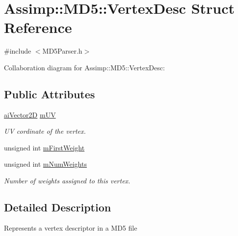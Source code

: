 \hypertarget{struct_assimp_1_1_m_d5_1_1_vertex_desc}{\section{Assimp\+:\+:M\+D5\+:\+:Vertex\+Desc Struct Reference}
\label{struct_assimp_1_1_m_d5_1_1_vertex_desc}
}


{\ttfamily \#include $<$M\+D5\+Parser.\+h$>$}



Collaboration diagram for Assimp\+:\+:M\+D5\+:\+:Vertex\+Desc\+:
\subsection*{Public Attributes}
\begin{DoxyCompactItemize}
\item 
\hypertarget{struct_assimp_1_1_m_d5_1_1_vertex_desc_ac45777884da83b11f67061725adef900}{\hyperlink{structai_vector2_d}{ai\+Vector2\+D} \hyperlink{struct_assimp_1_1_m_d5_1_1_vertex_desc_ac45777884da83b11f67061725adef900}{m\+U\+V}}\label{struct_assimp_1_1_m_d5_1_1_vertex_desc_ac45777884da83b11f67061725adef900}

\begin{DoxyCompactList}\small\item\em U\+V cordinate of the vertex. \end{DoxyCompactList}\item 
unsigned int \hyperlink{struct_assimp_1_1_m_d5_1_1_vertex_desc_a3106a81ce842f268266e80b5ca5a8532}{m\+First\+Weight}
\item 
\hypertarget{struct_assimp_1_1_m_d5_1_1_vertex_desc_aa975a083fbb1f490a266df9e2e9c495f}{unsigned int \hyperlink{struct_assimp_1_1_m_d5_1_1_vertex_desc_aa975a083fbb1f490a266df9e2e9c495f}{m\+Num\+Weights}}\label{struct_assimp_1_1_m_d5_1_1_vertex_desc_aa975a083fbb1f490a266df9e2e9c495f}

\begin{DoxyCompactList}\small\item\em Number of weights assigned to this vertex. \end{DoxyCompactList}\end{DoxyCompactItemize}


\subsection{Detailed Description}
Represents a vertex descriptor in a M\+D5 file 

